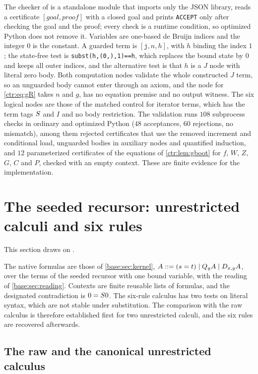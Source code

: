 The checker of  is a standalone module that imports only the JSON
library, reads a certificate $[\mathit{goal},\mathit{proof}]$ with a closed goal and prints
\texttt{ACCEPT} only after checking the goal and the proof; every check is a runtime
condition, so optimized Python does not remove it. Variables are one-based de Bruijn indices
and the integer $0$ is the constant. A guarded term is $[\texttt{j},n,h]$, with $h$ binding
the index $1$; the state-free test is \texttt{subst(h,(0,),1)==h}, which replaces the bound
state by $0$ and keeps all outer indices, and the alternative test is that $h$ is a $J$ node
with literal zero body. Both computation nodes validate the whole constructed $J$ term, so an
unguarded body cannot enter through an axiom, and the node for \eqref{ctr:eq:gR} takes $n$
and $g$, has no equation premise and no output witness. The six logical nodes are those of
the matched control for iterator terms, which has the term tags $S$ and $I$ and no body
restriction. The validation runs $108$ subprocess checks in ordinary and optimized Python
($48$ acceptances, $60$ rejections, no mismatch), among them rejected certificates that use
the removed increment and conditional load, unguarded bodies in auxiliary nodes and
quantified induction, and $12$ parameterized certificates of the equations of
\cref{ctr:lem:gboot} for $f$, $W$, $Z$, $G$, $C$ and $P$, checked with an empty context. These
are finite evidence for the implementation.

\section{The seeded recursor: unrestricted calculi and six rules}\label{ctr:sec:six}

This section draws on .

The native formulas are those of \cref{base:sec:kernel}, $A ::= (s=t)\mid Q_{y}A\mid D_{x,y}A$,
over the terms of the seeded recursor with one bound variable, with the reading of
\cref{base:sec:reading}. Contexts are finite reusable lists of formulas, and the designated
contradiction is $0=S 0$. The six-rule calculus has two tests on literal syntax, which
are not stable under substitution. The comparison with the raw calculus is therefore
established first for two unrestricted calculi, and the six rules are recovered afterwards.

\subsection{The raw and the canonical unrestricted calculus}

